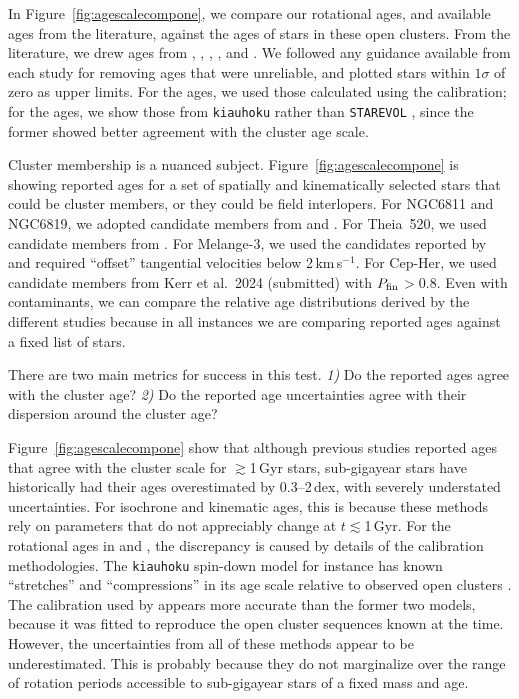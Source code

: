 \documentclass[11pt,twocolumn,tighten]{aastex63}
\newcommand{\kms}{{km\,s$^{-1}$}}
\begin{document}
In Figure~\ref{fig:agescalecompone}, we compare our rotational
ages, and available ages from the literature, against the ages of
stars in these open clusters. 
From the literature, we
drew ages from \citet{Reinhold_2015}, \citet{Berger_2020a_catalog},
\citet{2021AJ....161..189L}, \citet{2023ApJ...952..131M}, and
\citet{2024AJ....167..159L}.  We followed any guidance available from
each study for removing ages that were unreliable, and plotted stars
within $1\sigma$ of zero as upper limits.  For the
\citeauthor{Reinhold_2015} ages, we used those calculated using the
\citet{Mamajek_2008} calibration; for the
\citeauthor{2023ApJ...952..131M} ages, we show those from
\texttt{kiauhoku} \citep{Claytor2020} rather than \texttt{STAREVOL}
\citep{Amard2019}, since the former showed better agreement with the
cluster age scale.

Cluster membership is a nuanced subject.
Figure~\ref{fig:agescalecompone} is showing reported ages for a set of
spatially and kinematically selected stars that could be cluster
members, or they could be field interlopers.  For NGC6811 and NGC6819,
we adopted candidate members from
\citet{2018A&A...618A..93C,CantatGaudin_2020} and
\citet{Kounkel_2020}.  For Theia~520, we used candidate members from
\citet{Kounkel_2020}.  For Melange-3, we used the candidates reported
by \citet{Barber_2022} and required ``offset'' tangential velocities
below 2\,\kms.  For Cep-Her, we used candidate members from Kerr et
al.~2024 (submitted) with $P_{\rm fin}$$>$0.8.  Even with
contaminants, we can compare the relative age distributions derived by
the different studies because in all instances we are comparing
reported ages against a fixed list of stars.

There are two main metrics for success in this test. {\it 1)} Do the
reported ages agree with the cluster age? {\it 2)} Do the reported age
uncertainties agree with their dispersion around the cluster age?

Figure~\ref{fig:agescalecompone} show that although previous studies
reported ages that agree with the cluster scale for $\gtrsim$1\,Gyr
stars, sub-gigayear stars have historically had their ages
overestimated by 0.3--2\,dex, with severely understated uncertainties.
For isochrone and kinematic ages, this is because these methods rely
on parameters that do not appreciably change at $t$$\lesssim$1\,Gyr.
For the rotational ages in \citet{2023ApJ...952..131M} and
\citet{2024AJ....167..159L}, the discrepancy is caused by details of
the calibration methodologies.  The \texttt{kiauhoku} spin-down model
for instance has known ``stretches'' and ``compressions'' in its age
scale relative to observed open clusters \citep[see][Sec.
7.3]{2023ApJ...952..131M}.  The \citet{Mamajek_2008} calibration used
by \citet{Reinhold_2015} appears more accurate than the former two
models, because it was fitted to reproduce the open cluster sequences
known at the time.  However, the uncertainties from all of these
methods appear to be underestimated.  This is probably because they do
not marginalize over the range of rotation periods accessible to
sub-gigayear stars of a fixed mass and age.
\end{document}
